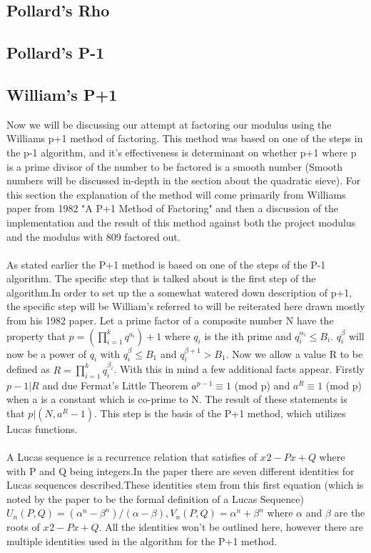 \documentclass[12pt]{article} %
\begin{document}
\subsection{Pollard's Rho}
\subsection{Pollard's P-1}


\subsection{William's P+1}
Now we will be discussing our attempt at factoring our modulus using the Williams p+1 method of factoring. This method was based on one of the steps in the p-1 algorithm, and it's effectiveness is determinant on whether p+1 where p is a prime divisor of the number to be factored is a smooth number (Smooth numbers will be discussed in-depth in the section about the quadratic sieve). For this section the explanation of the method will come primarily from Williams paper from 1982 "A P+1 Method of Factoring" and then a discussion of the implementation and the result of this method against both the project modulus and the modulus with 809 factored out.
\\\\
\indent As stated earlier the P+1 method is based on one of the steps of the P-1 algorithm. The specific step that is talked about is the first step of the algorithm.In order to set up the a somewhat  watered down description of p+1, the specific step will be William's referred to will be reiterated here drawn mostly from his 1982 paper. Let a prime factor of a composite number N have the property that $p = (\prod^{k}_{i=1}q^{a_i})+1$ where $q_i$ is the ith prime and $q^{\alpha_i}_i\leq B_i$. $q^{\beta}_i$ will now be a power of $q_i$  with $q^{\beta}_i \leq B_1$ and $q^{\beta+1}_i > B_1$. Now we allow a value R to be defined as $R= \prod^{k}_{i=1}q^{\beta _i}_i$. With this in mind a few additional facts appear. Firstly $p-1|R$ and due Fermat's Little Theorem  $a^{p-1} \equiv 1$ (mod p) and $a^{R} \equiv 1$ (mod p) when a is a constant which is co-prime to N. The result of these statements is that $p|(N,a^{R}-1)$. This step is the basis of the P+1 method, which utilizes Lucas functions.
\\\\
\indent A Lucas sequence is a recurrence relation that satisfies of $x^{}2 - Px+Q$ where with P and Q being integers.In the paper there are seven different identities for Lucas sequences described.These identities stem from this first equation (which is noted by the paper to be the formal definition of a Lucas Sequence)  $U_n(P,Q) = (\alpha^{n}-\beta^{n})/(\alpha-\beta), V_n(P,Q) = \alpha^{n}+\beta^{n}$ where $\alpha$ and $\beta$  are the roots of $x^{}2 - Px+Q$. All the identities won't be outlined here, however there are multiple identities used in the algorithm for the P+1 method. 
\end{document}

